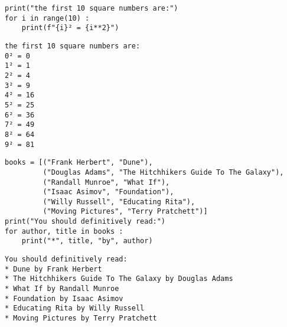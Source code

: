 
\begin{frame}[fragile]
%
\begin{codebox}
\begin{verbatim}
print("the first 10 square numbers are:")
for i in range(10) :
    print(f"{i}² = {i**2}")
\end{verbatim}
\end{codebox}
%
\begin{cmdbox}
\begin{verbatim}
the first 10 square numbers are:
0² = 0
1² = 1
2² = 4
3² = 9
4² = 16
5² = 25
6² = 36
7² = 49
8² = 64
9² = 81
\end{verbatim}
\end{cmdbox}
%
\end{frame}


\begin{frame}[fragile]
%
\begin{codebox}
\begin{verbatim}
books = [("Frank Herbert", "Dune"),
         ("Douglas Adams", "The Hitchhikers Guide To The Galaxy"),
         ("Randall Munroe", "What If"),
         ("Isaac Asimov", "Foundation"),
         ("Willy Russell", "Educating Rita"),
         ("Moving Pictures", "Terry Pratchett")]
print("You should definitively read:")
for author, title in books :
    print("*", title, "by", author)
\end{verbatim}
\end{codebox}
%
\begin{cmdbox}
\begin{verbatim}
You should definitively read:
* Dune by Frank Herbert
* The Hitchhikers Guide To The Galaxy by Douglas Adams
* What If by Randall Munroe
* Foundation by Isaac Asimov
* Educating Rita by Willy Russell
* Moving Pictures by Terry Pratchett
\end{verbatim}
\end{cmdbox}
%
\end{frame}

